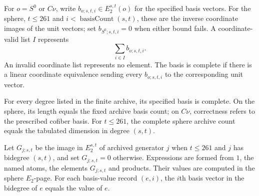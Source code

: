 \begin{definition}
\label{sem:Computation:table-realization}
For $o=S^0$ or $C\nu$, write $b_{o;s,t,i}\in E_2^{s,t}(o)$ for the specified basis vectors. For the sphere, $t\leq261$ and $i<\operatorname{basisCount}(s,t)$, these are the inverse coordinate images of the unit vectors; set $b_{S^0;s,t,i}=0$ when either bound fails. A coordinate-valid list $I$ represents
\[\sum_{i\in I}b_{o;s,t,i}.\]
An invalid coordinate list represents no element. The basis is complete if there is a linear coordinate equivalence sending every $b_{o;s,t,i}$ to the corresponding unit vector.
\end{definition}

\begin{theorem}
\label{sem:Computation:table-bases}
For every degree listed in the finite archive, its specified basis is complete. On the sphere, its length equals the fixed archive basis count; on $C\nu$, correctness refers to the prescribed cofiber basis. For $t\leq261$, the complete sphere archive count equals the tabulated dimension in degree $(s,t)$.
\end{theorem}

\begin{definition}
\label{sem:Computation:polynomial-values}
Let $G_{j;s,t}$ be the image in $E_2^{s,t}$ of archived generator $j$ when $t\leq261$ and $j$ has bidegree $(s,t)$, and set $G_{j;s,t}=0$ otherwise. Expressions are formed from $1$, the named atoms, the elements $G_{j;s,t}$ and products. Their values are computed in the sphere $E_2$-page. For each basis-value record $(e,i)$, the $i$th basis vector in the bidegree of $e$ equals the value of $e$.
\end{definition}


